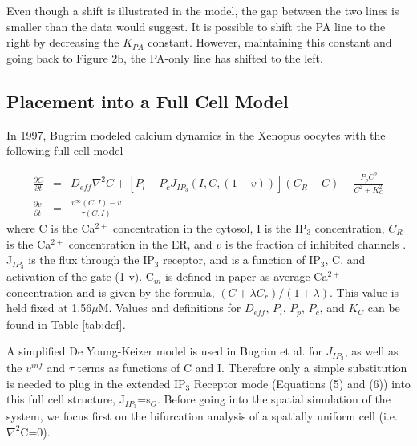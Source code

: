 \documentclass[preprint,12pt]{elsarticle}
\begin{document}

Even though a shift is illustrated in the model, the gap between the two lines is smaller than the data would suggest.  It is possible to shift the PA line to the right by decreasing the $K_{PA}$ constant. However, maintaining this constant and going back to Figure 2b, the PA-only line has shifted to the left. 

\subsection{Placement into a Full Cell Model}
In 1997, Bugrim modeled calcium dynamics in the Xenopus oocytes with the following full cell model

\begin{eqnarray}
	\frac{\partial C}{\partial t} &=& D_{eff} \nabla^2C+ [P_l + P_c J_{IP_3}(I,C,(1-v))](C_R-C) - \frac{P_pC^2}{C^2+K_C^2} \nonumber \\
	\frac{\partial v}{\partial t} &=& \frac{v^{\infty}(C,I)-v}{\tau(C,I)} \nonumber \
\end{eqnarray}
where C is the Ca$^{2+}$ concentration in the cytosol, I is the IP$_3$ concentration, $C_R$ is the Ca$^{2+}$ concentration in the ER, and $v$ is the fraction of inhibited channels \cite{bug}. J$_{IP_3}$ is the flux through the IP$_3$ receptor, and is a function of IP$_3$, C, and activation of the gate (1-v). C$_m$ is defined in paper as average Ca$^{2+}$ concentration and is given by the formula, $(C+\lambda C_r)/(1+\lambda)$. This value is held fixed at 1.56$\mu$M. Values and definitions for $D_{eff}$, $P_l$, $P_p$, $P_c$, and $K_C$ can be found in Table \ref{tab:def}.

A simplified De Young-Keizer model is used in Bugrim et al. for $J_{IP_3}$, as well as the $v^{inf}$ and $\tau$ terms as functions of C and I. Therefore only a simple substitution is needed to plug in the extended IP$_3$ Receptor mode (Equations (5) and (6)) into this full cell structure, J$_{IP_3}$=s$_O$. Before going into the spatial simulation of the system, we focus first on the bifurcation analysis of a spatially uniform cell (i.e. $\nabla^2$C=0).
\end{document}
